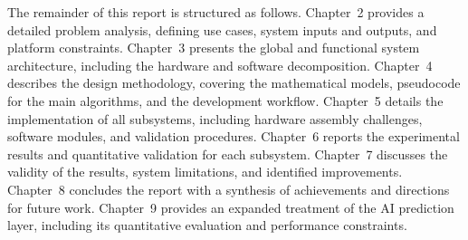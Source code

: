 The remainder of this report is structured as follows.
Chapter~2 provides a detailed problem analysis, defining use cases, system inputs and
outputs, and platform constraints.
Chapter~3 presents the global and functional system architecture, including the hardware
and software decomposition.
Chapter~4 describes the design methodology, covering the mathematical models,
pseudocode for the main algorithms, and the development workflow.
Chapter~5 details the implementation of all subsystems, including hardware assembly
challenges, software modules, and validation procedures.
Chapter~6 reports the experimental results and quantitative validation for each
subsystem.
Chapter~7 discusses the validity of the results, system limitations, and identified
improvements.
Chapter~8 concludes the report with a synthesis of achievements and directions for
future work.
Chapter~9 provides an expanded treatment of the AI prediction layer, including its
quantitative evaluation and performance constraints.
